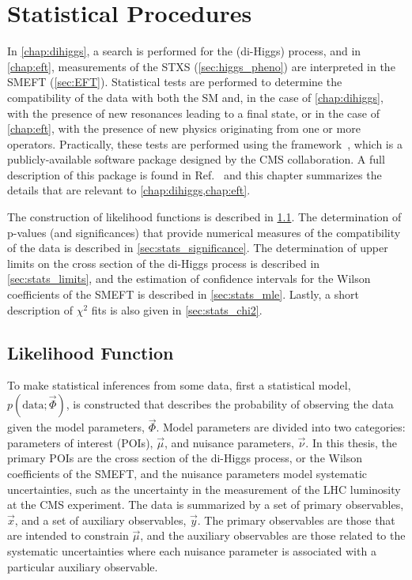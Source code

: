 \chapter{Statistical Procedures}\label{chap:stats}

In \cref{chap:dihiggs}, a search is performed for the \ppXHHYggtt (di-Higgs) process, and in \cref{chap:eft}, measurements of the STXS (\cref{sec:higgs_pheno}) are interpreted in the SMEFT (\cref{sec:EFT}). Statistical tests are performed to determine the compatibility of the data with both the SM and, in the case of \cref{chap:dihiggs}, with the presence of new resonances leading to a \ggtt final state, or in the case of \cref{chap:eft}, with the presence of new physics originating from one or more \Lsix operators. Practically, these tests are performed using the \COMBINE framework~\cite{CMS:2024onh}, which is a publicly-available software package designed by the CMS collaboration. A full description of this package is found in Ref.~\cite{CMS:2024onh} and this chapter summarizes the details that are relevant to \cref{chap:dihiggs,chap:eft}.

The construction of likelihood functions is described in \cref{sec:ggtt_stats_likelihood}. The determination of p-values (and significances) that provide numerical measures of the compatibility of the data is described in \cref{sec:stats_significance}. The determination of upper limits on the cross section of the di-Higgs process is described in \cref{sec:stats_limits}, and the estimation of confidence intervals for the Wilson coefficients of the SMEFT is described in \cref{sec:stats_mle}. Lastly, a short description of $\chi^2$ fits is also given in \cref{sec:stats_chi2}.

\section{Likelihood Function}\label{sec:ggtt_stats_likelihood}

To make statistical inferences from some data, first a statistical model, $p(\text{data};\vec{\Phi})$, is constructed that describes the probability of observing the data given the model parameters, $\vec{\Phi}$. Model parameters are divided into two categories: parameters of interest (POIs), $\vec{\mu}$, and nuisance parameters, $\vec{\nu}$. In this thesis, the primary POIs are the cross section of the di-Higgs process, or the Wilson coefficients of the SMEFT, and the nuisance parameters model systematic uncertainties, such as the uncertainty in the measurement of the LHC luminosity at the CMS experiment. The data is summarized by a set of primary observables, $\vec{x}$, and a set of auxiliary observables, $\vec{y}$. The primary observables are those that are intended to constrain $\vec{\mu}$, and the auxiliary observables are those related to the systematic uncertainties where each nuisance parameter is associated with a particular auxiliary observable.

